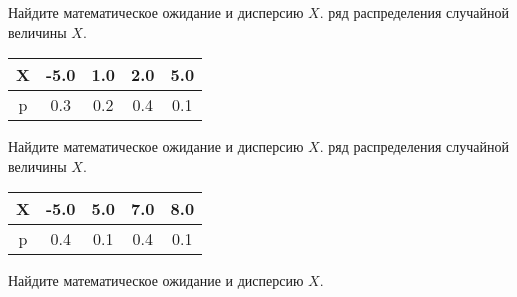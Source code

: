 \documentclass[a4paper,12pt]{article}
\begin{document}
    Найдите математическое ожидание и дисперсию $X$.
    \bigskip{}\medskip{} ряд распределения случайной величины $X$. 
    \begin{center} 
    \begin{tabular}{|c|c|c|c|c|}


\hline
X & -5.0 &  1.0 &  2.0 &  5.0 \\ \hline
p &  0.3 &  0.2 &  0.4 &  0.1 \\ \hline

\end{tabular}

    \end{center}
    Найдите математическое ожидание и дисперсию $X$.
    \bigskip{}\medskip{} ряд распределения случайной величины $X$. 
    \begin{center} 
    \begin{tabular}{|c|c|c|c|c|}


\hline
X & -5.0 &  5.0 &  7.0 &  8.0 \\ \hline
p &  0.4 &  0.1 &  0.4 &  0.1 \\ \hline

\end{tabular}

    \end{center}
    Найдите математическое ожидание и дисперсию $X$.
    \bigskip\par
\end{document}
